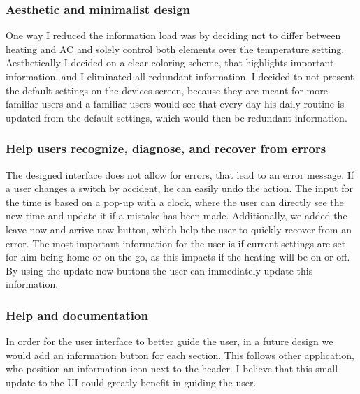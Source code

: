 \documentclass[]{interact}
\theoremstyle{plain}%
\theoremstyle{definition}
\theoremstyle{remark}
\begin{document}
\subsubsection*{Aesthetic and minimalist design}

One way I reduced the information load was by deciding not to differ between heating and AC and solely control both elements over the temperature setting. Aesthetically I decided on a clear coloring scheme, that highlights important information, and I eliminated all redundant information. I decided to not present the default settings on the devices screen, because they are meant for more familiar users and a familiar users would see that every day his daily routine is updated from the default settings, which would then be redundant information.

\subsubsection*{Help users recognize, diagnose, and recover from errors}

The designed interface does not allow for errors, that lead to an error message. If a user changes a switch by accident, he can easily undo the action. The input for the time is based on a pop-up with a clock, where the user can directly see the new time and update it if a mistake has been made. Additionally, we added the leave now and arrive now button, which help the user to quickly recover from an error. The most important information for the user is if current settings are set for him being home or on the go, as this impacts if the heating will be on or off. By using the update now buttons the user can immediately update this information.


\subsubsection*{Help and documentation}

In order for the user interface to better guide the user, in a future design we would add an information button for each section. This follows other application, who position an information icon next to the header. I believe that this small update to the UI could greatly benefit in guiding the user.
\end{document}
